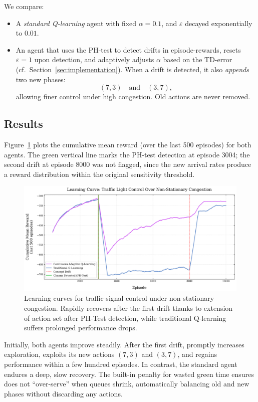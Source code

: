We compare:
\begin{itemize}
  \item A \emph{standard Q-learning} agent with fixed $\alpha=0.1$, and $\varepsilon$ decayed exponentially to $0.01$.
  \item An \emph{\adaptiverl} agent that uses the PH-test to detect drifts in episode-rewards, resets $\varepsilon\!=\!1$ upon detection, and adaptively adjusts $\alpha$ based on the TD-error (cf.\ Section~\ref{sec:implementation}).  When a drift is detected, it also \emph{appends} two new phases:
  \[
    (7,3)\quad\text{and}\quad(3,7),
  \]
  allowing finer control under high congestion. Old actions are never removed.
\end{itemize}

\subsection{Results}
Figure~\ref{fig:traffic-learning-curve} plots the cumulative mean reward (over the last 500 episodes) for both agents. The green vertical line marks the PH-test detection at episode 3004; the second drift at episode 8000 was not flagged, since the new arrival rates produce a reward distribution within the original sensitivity threshold.

\begin{figure}
    \centering
    \includegraphics[width=\textwidth]{figures/traffic_learning_curve.png}
    \caption{Learning curves for traffic-signal control under non-stationary congestion. Rapidly recovers after the first drift thanks to extension of action set after PH-Test detection, while traditional Q-learning suffers prolonged performance drops.}
    \label{fig:traffic-learning-curve}
\end{figure}

Initially, both agents improve steadily. After the first drift, \adaptiverl promptly increases exploration, exploits its new actions $(7,3)$ and $(3,7)$, and regains performance within a few hundred episodes. In contrast, the standard agent endures a deep, slow recovery. The built-in penalty for wasted green time ensures \adaptiverl does not “over-serve” when queues shrink, automatically balancing old and new phases without discarding any actions.

